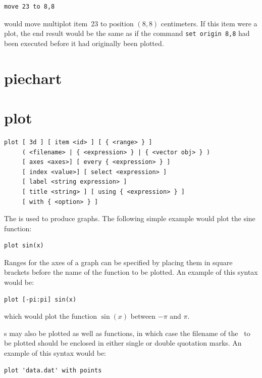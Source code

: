 \begin{verbatim}
move 23 to 8,8
\end{verbatim}

\noindent would move multiplot item~23 to position $(8,8)$ centimeters. If this
item were a plot, the end result would be the same as if the command {\tt set
origin 8,8} had been executed before it had originally been plotted.


\section{piechart}


\section{plot}

\begin{verbatim}
plot [ 3d ] [ item <id> ] [ { <range> } ]
     ( <filename> | { <expression> } | { <vector obj> } )
     [ axes <axes>] [ every { <expression> } ]
     [ index <value>] [ select <expression> ]
     [ label <string expression> ]
     [ title <string> ] [ using { <expression> } ]
     [ with { <option> } ]
\end{verbatim}

The  is used to produce graphs. The following simple example
would plot the sine function:

\begin{verbatim}
plot sin(x)
\end{verbatim}

Ranges for the axes of a graph can be specified by placing them in
square brackets before the name of the function to be plotted. An example of
this syntax would be:

\begin{verbatim}
plot [-pi:pi] sin(x)
\end{verbatim}

\noindent which would plot the function $\sin(x)$ between $-\pi$ and $\pi$.

\Datafile s may also be plotted as well as functions, in which case the
filename of the \datafile\ to be plotted should be enclosed in either single or
double quotation marks. An example of this syntax would be:

\begin{verbatim}
plot 'data.dat' with points
\end{verbatim}


